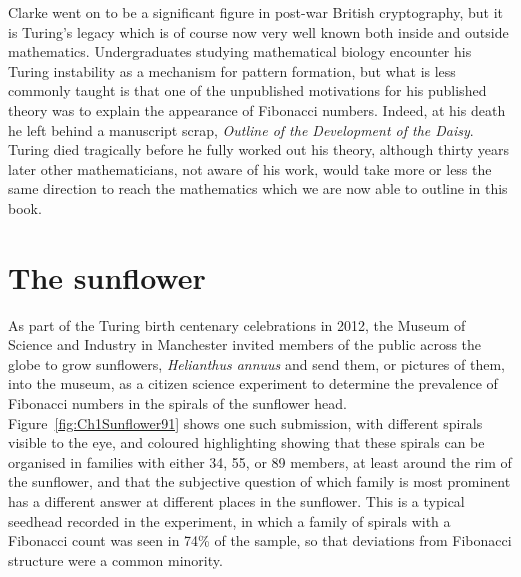 Clarke went on to be a significant figure in post-war British cryptography, but it is Turing's legacy which is of course now very well known both inside and outside mathematics.
Undergraduates studying mathematical biology encounter his Turing instability as a mechanism for pattern formation, but what is less commonly taught is that one of the unpublished motivations for his published theory was to explain the appearance of Fibonacci numbers. Indeed, at his death he left behind a manuscript scrap, \textit{Outline of the Development of the Daisy}. Turing died tragically before he fully worked out his theory, although thirty years later other mathematicians, not aware of his work, would take more or less the same direction to reach the mathematics which we are now able to outline in this book. 


\section{The sunflower}

As part of the Turing birth centenary celebrations in 2012, the Museum of Science and Industry in Manchester invited members of the public across the globe to grow sunflowers, \textit{Helianthus annuus} and send them, or pictures of them, into the museum, as a citizen science experiment to determine the prevalence of Fibonacci numbers in the spirals of the sunflower head. Figure~\ref{fig:Ch1Sunflower91} shows one such submission, with different spirals visible to the eye, 
and coloured highlighting showing that these spirals can be organised in families with either 34, 55, or 89 members, at least around the rim of the sunflower, and that the subjective question of which family is most prominent has a different answer at different places in the sunflower.  This is a typical seedhead recorded in the experiment, in which a family of spirals with a Fibonacci count was seen in 74\% of the sample, so that deviations from Fibonacci structure were a common minority.

